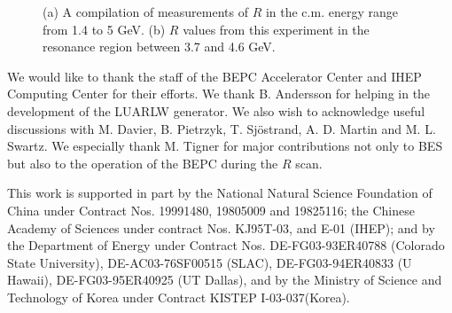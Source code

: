 \begin{figure}[!htb] 
\epsfysize=3.5in
\centerline{}
\caption{(a) A compilation of measurements of $R$ in the c.m.
energy range from 1.4 to 5 GeV. (b) $R$ values from this experiment 
in the resonance region between 3.7 and 4.6 GeV.} %
\label{fig:besr}
\end{figure}

We would like to thank the staff of the BEPC Accelerator Center
and IHEP Computing Center for their efforts.  
We thank B. Andersson for helping in the development of the LUARLW generator.
We also wish to acknowledge useful discussions with M. Davier, 
B. Pietrzyk, T. Sj\"{o}strand,  A. D. Martin and M. L. Swartz.
We especially thank M. Tigner for major contributions not only to
BES but also to the operation of the BEPC during the $R$ scan.

This work is supported in part by the National Natural
 Science Foundation of China under Contract Nos. 19991480,
19805009 and 19825116; the Chinese
 Academy of Sciences under contract Nos. KJ95T-03, and E-01 (IHEP);
 and by the Department of
 Energy under Contract Nos.
 DE-FG03-93ER40788 (Colorado State University),
 DE-AC03-76SF00515 (SLAC),
 DE-FG03-94ER40833 (U Hawaii), DE-FG03-95ER40925 (UT Dallas),
and by the Ministry of Science and Technology of Korea under Contract
KISTEP I-03-037(Korea).


